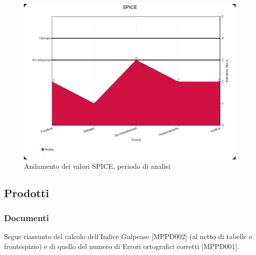 \documentclass[openany,12pt,a4paper]{report}
\begin{document}
\begin{figure}[H]
	\includegraphics[scale=0.5]{Spice/spice-analisi}
	\centering
	\caption{Andamento dei valori SPICE, periodo di analisi}
\end{figure}

\subsection{Prodotti}

\subsubsection{Documenti}

Segue riassunto del calcolo dell'Indice Gulpease [MPPD002] (al netto di tabelle e frontespizio) e di quello del numero di Errori ortografici corretti [MPPD001].
\end{document}
